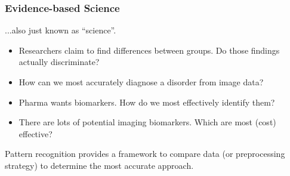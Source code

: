 


\begin{frame}
\frametitle{Evidence-based Science}
...also just known as ``science''.
\vspace{0.5cm}
\begin{itemize}
\item{Researchers claim to find differences between groups.  Do those findings actually discriminate?}
\item{How can we most accurately diagnose a disorder from image data?}
\item{Pharma wants biomarkers.  How do we most effectively identify them?}
\item{There are lots of potential imaging biomarkers.  Which are most (cost) effective?}
\end{itemize}

Pattern recognition provides a framework to compare data (or preprocessing strategy) to determine the most accurate approach.
\end{frame}

